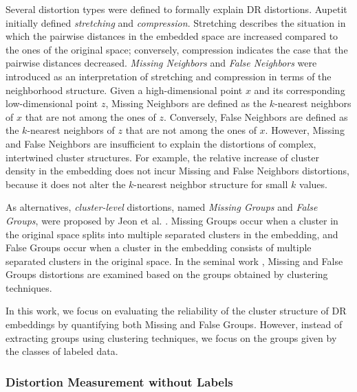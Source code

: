 Several distortion types were defined to formally explain DR distortions. Aupetit \cite{aupetit07neurocomputing} initially defined \textit{stretching} and \textit{compression}. Stretching describes the situation in which the pairwise distances in the embedded space are increased compared to the ones of the original space; conversely, compression indicates the case that the pairwise distances decreased. \textit{Missing Neighbors} and \textit{False Neighbors} \cite{lespinats07tnn, lespinats11cgf, venna10jmlr, lee07springer} were introduced as an interpretation of stretching and compression in terms of the neighborhood structure. Given a high-dimensional point $x$ and its corresponding low-dimensional point $z$, Missing Neighbors are defined as the $k$-nearest neighbors of $x$ that are not among the ones of $z$. Conversely, False Neighbors are defined as the $k$-nearest neighbors of $z$ that are not among the ones of $x$. 
However, Missing and False Neighbors are insufficient to explain the distortions of complex, intertwined cluster structures. 
For example,  the relative increase of cluster density in the embedding does not incur Missing and False Neighbors distortions, because it does not alter the $k$-nearest neighbor structure for small $k$ values.



As alternatives, \textit{cluster-level} distortions, named \textit{Missing Groups} and \textit{False Groups}, were proposed by Jeon et al. \cite{jeon21tvcg}. Missing Groups  occur when a cluster in the original space splits into multiple separated clusters in the embedding, and False Groups occur when a cluster in the embedding consists of multiple separated clusters in the original space. 
In the seminal work \cite{jeon21tvcg}, Missing and False Groups distortions are examined based on the groups obtained by clustering techniques. 


In this work, we focus on evaluating the reliability of the cluster structure of DR embeddings by quantifying both Missing and False Groups.
However, instead of extracting groups using clustering techniques, we focus on the groups given by the classes of labeled data.



\subsubsection{Distortion Measurement without Labels}

\label{sec:disme}

